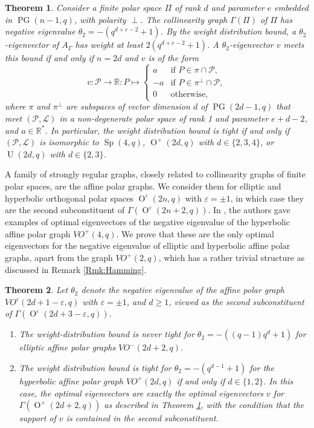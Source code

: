 \documentclass[a4paper]{article}
\newtheorem{thm}{Theorem}[section]
\theoremstyle{definition}
\newcommand{\eps}{\varepsilon}
\newcommand{\RR}{\mathbb R}
\renewcommand{\geq}{\geqslant}
\newcommand{\ml}{\mathcal L}
\renewcommand{\mp}{\mathcal P}
\DeclareMathOperator{\PG}{PG}
\newcommand{\pg}{\PG}
\DeclareMathOperator{\Sp}{Sp}
\DeclareMathOperator{\OO}{O}
\DeclareMathOperator{\U}{U}
\begin{document}
\begin{thm}
 \label{Thm:Main:Coll}
 Consider a finite polar space $\Pi$ of rank $d$ and parameter $e$ embedded in $\pg(n-1,q)$, with polarity $\perp$.
 The collinearity graph $\Gamma(\Pi)$ of $\Pi$ has negative eigenvalue $\theta_2 = - (q^{d+e-2}+1)$.
 By the weight distribution bound, a $\theta_2$-eigenvector of $A_\Gamma$ has weight at least $2(q^{d+e-2}+1)$.
 A $\theta_2$-eigenvector $v$ meets this bound if and only if $n=2d$ and $v$ is of the form
 \[
  v: \mp \to \RR: P \mapsto \begin{cases}
   a & \text{if } P \in \pi \cap \mp, \\
   -a & \text{if } P \in \pi^\perp \cap \mp, \\
   0 & \text{otherwise,}
  \end{cases}
 \]
 where $\pi$ and $\pi^\perp$ are subspaces of vector dimension $d$ of  $\pg(2d-1,q)$ that meet $(\mp,\ml)$ in a non-degenerate polar space of rank 1 and parameter $e+d-2$, and $a \in \RR^*$.
 In particular, the weight distribution bound is tight if and only if $(\mp,\ml)$ is isomorphic to $\Sp(4,q)$, $\OO^+(2d,q)$ with $d \in \{2,3,4\}$, or $\U(2d,q)$ with $d \in \{2,3\}$.
\end{thm}

A family of strongly regular graphs, closely related to collinearity graphs of finite polar spaces, are the affine polar graphs.
We consider them for elliptic and hyperbolic orthogonal polar spaces $\OO^\eps(2n,q)$ with $\eps = \pm 1$, in which case they are the second subconstituent of $\Gamma(\OO^\eps(2n+2,q))$.
In \cite[Proposition 2.2]{yip}, the authors gave examples of optimal eigenvectors of the negative eigenvalue of the hyperbolic affine polar graph $VO^+(4,q)$. 
We prove that these are the only optimal eigenvectors for the negative eigenvalue of elliptic and hyperbolic affine polar graphs, apart from the graph $VO^+(2,q)$, which has a rather trivial structure as discussed in Remark \ref{Rmk:Hamming}.

\begin{thm}
 \label{Thm:Main:Affine}
 Let $\theta_2$ denote the negative eigenvalue of the affine polar graph $VO^\eps(2d+1-\eps,q)$ with $\eps = \pm 1$, and $d \geq 1$, viewed as the second subconstituent of $\Gamma(\OO^\eps(2d+3-\eps,q))$.
 \begin{enumerate}
  \item The weight-distribution bound is never tight for $\theta_2 = -((q-1)q^d+1)$ for elliptic affine polar graphs $VO^-(2d+2,q)$.
  \item The weight distribution bound is tight for $\theta_2 = -(q^{d-1}+1)$ for the hyperbolic affine polar graph $VO^+(2d,q)$ if and only if $d \in \{1,2\}$.
  In this case, the optimal eigenvectors are exactly the optimal eigenvectors $v$ for $\Gamma(\OO^+(2d+2,q))$ as described in Theorem \ref{Thm:Main:Coll}, with the condition that the support of $v$ is contained in the second subconstituent.
 \end{enumerate}
\end{thm}
\end{document}
